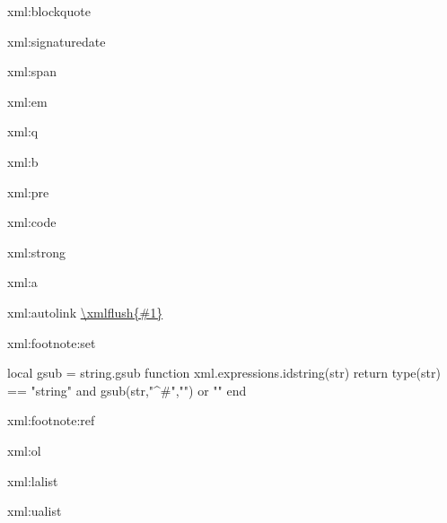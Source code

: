 \startxmlsetups xml:blockquote
    \startnarrow{}\stopnarrow
\stopxmlsetups

\startxmlsetups xml:signaturedate
    \startalign[flushright]
    \stopalign
\stopxmlsetups

\startxmlsetups xml:span
\stopxmlsetups

\startxmlsetups xml:em
    \begingroup\em {}\endgroup
\stopxmlsetups

\startxmlsetups xml:q
\stopxmlsetups

\startxmlsetups xml:b
    \begingroup\bf{}\endgroup
\stopxmlsetups

\startxmlsetups xml:pre
    \par
\stopxmlsetups

\startxmlsetups xml:code
    \begingroup\tt{}\endgroup
\stopxmlsetups

\startxmlsetups xml:strong
    \begingroup\bf{}\endgroup
\stopxmlsetups

\startxmlsetups xml:a
    \href{\xmlatt{#1}{href}}{}
\stopxmlsetups

\startxmlsetups xml:autolink
    \url{\xmlflush{#1}}
\stopxmlsetups

\startxmlsetups xml:footnote:set
     \startfootnote
     \stopfootnote
\stopxmlsetups

\startluacode
     local gsub = string.gsub
     function xml.expressions.idstring(str)
         return type(str) == "string" and gsub(str,"^#","") or ""
     end
\stopluacode

\startxmlsetups xml:footnote:ref
\stopxmlsetups



\startxmlsetups xml:ol
    {\startitemize[n][start=\xmlatt{#1}{start}]
    \stopitemize}
    {\startitemize[n]
    \stopitemize}
\stopxmlsetups

\startxmlsetups xml:lalist
    {\startitemize[a][start=\xmlatt{#1}{start}]
    \stopitemize}
    {\startitemize[a]
    \stopitemize}
\stopxmlsetups

\startxmlsetups xml:ualist
    {\startitemize[A][start=\xmlatt{#1}{start}]
    \stopitemize}
    {\startitemize[A]
    \stopitemize}
\stopxmlsetups

